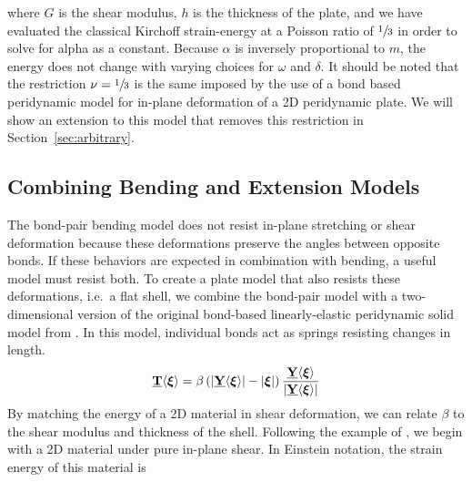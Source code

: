 \documentclass[preprint,review,12pt]{elsarticle}
\newcommand\vstate[3]{%
	\mathbf{\underline{#1}}%
	\ifstrempty{#2}{}{[#2]}%
	\ifstrempty{#3}{}{\langle #3 \rangle}}
\begin{document}
%
where $G$ is the shear modulus, $h$ is the thickness of the plate, and we have evaluated the classical Kirchoff strain-energy at a Poisson ratio of \(\sfrac{1}{3}\) in order to solve for alpha as a constant.  Because $\alpha$ is inversely proportional to $m$, the energy does not change with varying choices for $\omega$ and $\delta$. It should be noted that the restriction \(\nu=\sfrac{1}{3}\) is the same imposed by the use of a bond based peridynamic model for in-plane deformation of a 2D peridynamic plate. We will show an extension to this model that removes this restriction in Section~\ref{sec:arbitrary}.

\subsection{Combining Bending and Extension Models}
The bond-pair bending model does not resist in-plane stretching or shear deformation because these deformations preserve the angles between opposite bonds.   If these behaviors are expected in combination with bending, a useful model must resist both.  To create a plate model that also resists these deformations, i.e.\ a flat shell, we combine the bond-pair model with a two-dimensional version of the original bond-based linearly-elastic peridynamic solid model from \cite{silling2000reformulation}.  In this model, individual bonds act as springs resisting changes in length.
%
\begin{equation}
    \label{eq:bondextension}
    \vstate{T}{}{\boldsymbol{\xi}} =\beta\left(|\vstate{Y}{}{\boldsymbol{\xi}}|-|\boldsymbol{\xi}|\right)\frac{\vstate{Y}{}{\boldsymbol{\xi}}}{|\vstate{Y}{}{\boldsymbol{\xi}}|}
\end{equation}
%
By matching the energy of a 2D material in shear deformation, we can relate \(\beta\) to the shear modulus and thickness of the shell.  Following the example of \cite{silling2007peridynamic}, we begin with a 2D material under pure in-plane shear.  In Einstein notation, the strain energy of this material is
%
\end{document}
